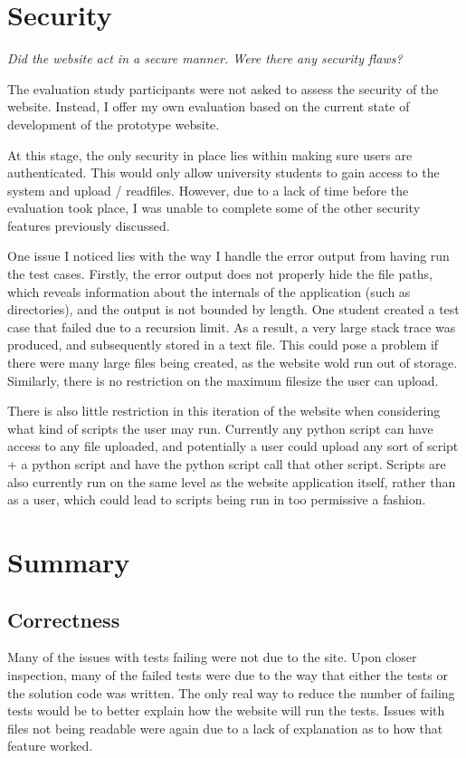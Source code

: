 \documentclass[a4paper,11pt]{report}
\begin{document}
\section{Security}
\textit{Did the website act in a secure manner. Were there any security flaws?}\par
The evaluation study participants were not asked to assess the security of the website. Instead, I offer my own evaluation based on the current state of development of the prototype website.\par
At this stage, the only security in place lies within making sure users are authenticated. This would only allow university students to gain access to the system and upload / readfiles. However, due to a lack of time before the evaluation took place, I was unable to complete some of the other security features previously discussed.\par
One issue I noticed lies with the way I handle the error output from having run the test cases. Firstly, the error output does not properly hide the file paths, which reveals information about the internals of the application (such as directories), and the output is not bounded by length. One student created a test case that failed due to a recursion limit. As a result, a very large stack trace was produced, and subsequently stored in a text file. This could pose a problem if there were many large files being created, as the website wold run out of storage. Similarly, there is no restriction on the maximum filesize the user can upload.\par
There is also little restriction in this iteration of the website when considering what kind of scripts the user may run. Currently any python script can have access to any file uploaded, and potentially a user could upload any sort of script + a python script and have the python script call that other script. Scripts are also currently run on the same level as the website application itself, rather than as a user, which could lead to scripts being run in too permissive a fashion.

\section{Summary}
\subsection{Correctness}
Many of the issues with tests failing were not due to the site. Upon closer inspection, many of the failed tests were due to the way that either the tests or the solution code was written. The only real way to reduce the number of failing tests would be to better explain how the website will run the tests. Issues with files not being readable were again due to a lack of explanation as to how that feature worked.
\end{document}

